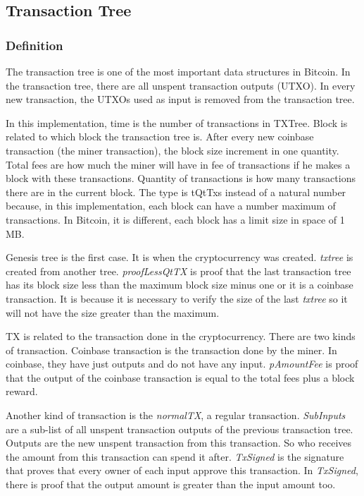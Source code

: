 \subsection{Transaction Tree}

\subsubsection{Definition}

The transaction tree is one of the most important data structures in Bitcoin.
In the transaction tree, there are all unspent transaction outputs (UTXO).
In every new transaction, the UTXOs used as input is removed from the transaction tree.


In this implementation, time is the number of transactions in TXTree.
Block is related to which block the transaction tree is.
After every new coinbase transaction (the miner transaction), the block size increment in one quantity.
Total fees are how much the miner will have in fee of transactions if he makes a block with these
transactions.
Quantity of transactions is how many transactions there are in the current block.
The type is tQtTxs instead of a natural number because, in this implementation, each block can have
a number maximum of transactions.
In Bitcoin, it is different, each block has a limit size in space of 1 MB.

Genesis tree is the first case.
It is when the cryptocurrency was created.
\emph{txtree} is created from another tree.
\emph{proofLessQtTX} is proof that the last transaction tree has its
block size less than the maximum block size minus one or it is a coinbase transaction.
It is because it is necessary to verify the size of the last \emph{txtree} so it will not have
the size greater than the maximum.


TX is related to the transaction done in the cryptocurrency.
There are two kinds of transaction.
Coinbase transaction is the transaction done by the miner.
In coinbase, they have just outputs and do not have any input.
\emph{pAmountFee} is proof that the output of the coinbase transaction is equal to the total fees plus
a block reward.

Another kind of transaction is the \emph{normalTX}, a regular transaction.
\emph{SubInputs} are a sub-list of all unspent transaction outputs of the previous transaction tree.
Outputs are the new unspent transaction from this transaction.
So who receives the amount from this transaction can spend it after.
\emph{TxSigned} is the signature that proves that every owner of each input approve this transaction.
In \emph{TxSigned}, there is proof that the output amount is greater than the input amount too.

